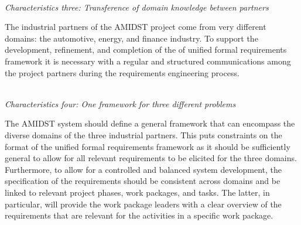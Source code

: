 
\ \\
\noindent \emph{Characteristics three: Transference of domain knowledge between  partners}
\label{sec:characteristic3}

The industrial partners of the AMIDST project come from very different domains: the automotive, energy, and finance
industry. To support the development, refinement, and completion of the of unified formal requirements framework it is
necessary with a regular and structured communications among the project partners during the requirements engineering
process. 


\ \\
\noindent \emph{Characteristics four:  One framework for three different problems}
\label{sec:characteristic4}

The AMIDST system should define a general framework that can encompass the diverse domains of the three industrial
partners. This puts constraints on the format of the unified formal requirements framework as it should be sufficiently general to
allow for all relevant requirements to be elicited for the three domains. Furthermore, to allow for a controlled and
balanced system development, the specification of the requirements should be consistent across domains and be linked to
relevant project phases, work packages, and tasks. The latter, in particular, will provide the work package leaders with
a clear overview of the requirements that are relevant for the activities in a specific work package.   


